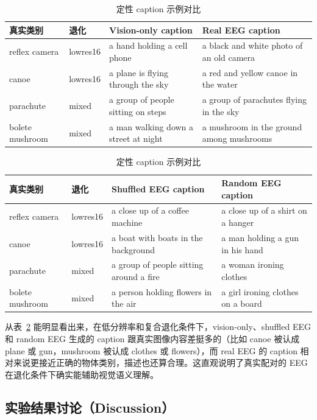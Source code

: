 \begin{table}[htbp]
  \centering
  \caption{定性 caption 示例对比}
  \label{tab:qualitative}
  \begin{tabularx}{\linewidth}{l l X X}
    \toprule
    真实类别 & 退化 & Vision-only caption & Real EEG caption \\
    \midrule
    reflex camera & lowres16 & a hand holding a cell phone & a black and white photo of an old camera \\
    canoe & lowres16 & a plane is flying through the sky & a red and yellow canoe in the water \\
    parachute & mixed & a group of people sitting on steps & a group of parachutes flying in the sky \\
    bolete mushroom & mixed & a man walking down a street at night & a mushroom in the ground among mushrooms \\
    \bottomrule
  \end{tabularx}

  \vspace{4pt}
  \begin{tabularx}{\linewidth}{l l X X}
    \toprule
    真实类别 & 退化 & Shuffled EEG caption & Random EEG caption \\
    \midrule
    reflex camera & lowres16 & a close up of a coffee machine & a close up of a shirt on a hanger \\
    canoe & lowres16 & a boat with boats in the background & a man holding a gun in his hand \\
    parachute & mixed & a group of people sitting around a fire & a woman ironing clothes \\
    bolete mushroom & mixed & a person holding flowers in the air & a girl ironing clothes on a board \\
    \bottomrule
  \end{tabularx}
\end{table}

从表~\ref{tab:qualitative} 能明显看出来，在低分辨率和复合退化条件下，vision-only、shuffled EEG 和 random EEG 生成的 caption 跟真实图像内容差挺多的（比如 canoe 被认成 plane 或 gun，mushroom 被认成 clothes 或 flowers），而 real EEG 的 caption 相对来说更接近正确的物体类别，描述也还算合理。这直观说明了真实配对的 EEG 在退化条件下确实能辅助视觉语义理解。

\subsection{实验结果讨论（Discussion）}

